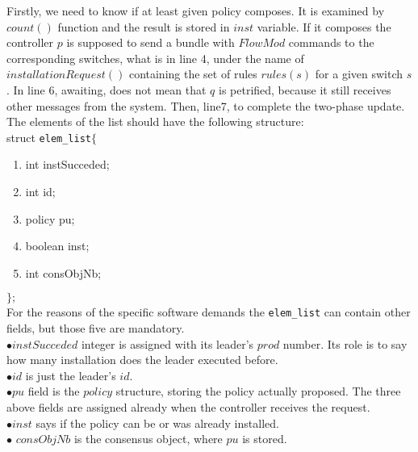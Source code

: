 \documentclass{article}
\theoremstyle{remark}
\begin{document}
Firstly, we need to know if at least given policy composes. It is examined by $count()$ function and the result is stored in $inst$ variable. If it composes the controller $p$ is supposed to send a bundle with $FlowMod$ commands to the corresponding switches, what is in line 4, under the name of $installationRequest()$ containing the set of rules $rules(s)$ for a given switch $s$. In line 6, awaiting, does not mean that $q$ is petrified, because it still receives other messages from the system. Then, line7, to complete the two-phase update.
\\The elements of the list should have the following structure:\\
struct \texttt{elem\_list}$\lbrace$
\begin{enumerate}
\item int instSucceded;
\item int id;
\item policy pu;
\item boolean inst;
\item int consObjNb;
\end{enumerate}
$\rbrace ;$\\
For the reasons of the specific software demands the \texttt{elem\_list} can contain other fields, but those five are mandatory.\\
$\bullet instSucceded$ integer is assigned with its leader's $prod$ number. Its role is to say how many installation does the leader executed before. \\
$\bullet id$ is just the leader's $id$.\\
$\bullet pu$ field is the $policy$ structure, storing the policy actually proposed. The three above fields are assigned already when the controller receives the request.\\
$\bullet inst$ says if the policy can be or was already installed.\\
$\bullet$ $consObjNb$ is the consensus object, where $pu$ is stored.\\

\end{document}
